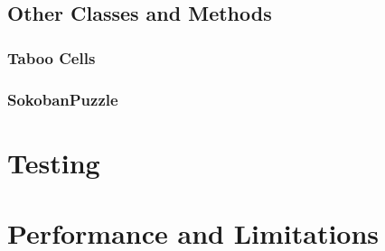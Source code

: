 \documentclass[a4paper,12pt]{article}
\begin{document}
\subsection{Other Classes and Methods}
\subsubsection{Taboo Cells}
\subsubsection{SokobanPuzzle}

\section{Testing}

\section{Performance and Limitations}
\end{document}
